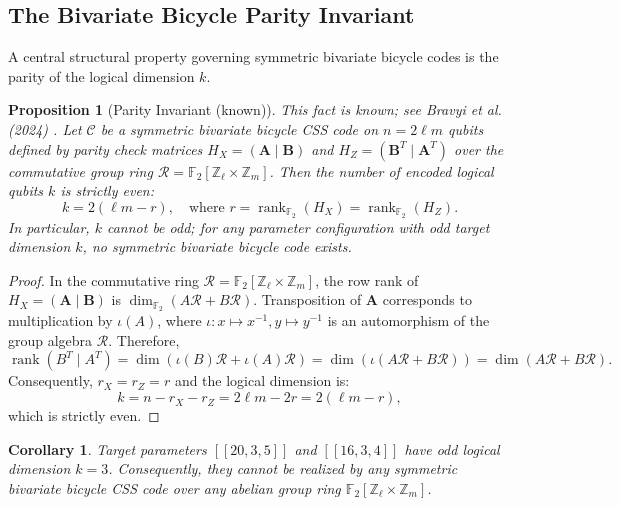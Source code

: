 \documentclass[11pt,a4paper]{article}
\newtheorem{proposition}[theorem]{Proposition}
\newtheorem{corollary}[theorem]{Corollary}
\begin{document}
\subsection{The Bivariate Bicycle Parity Invariant}
\label{sec:parity_invariant}
A central structural property governing symmetric bivariate bicycle codes is the parity of the logical dimension $k$.

\begin{proposition}[Parity Invariant (known)]
\label{prop:parity_invariant}
This fact is known; see Bravyi et al. (2024) \cite{bravyi2024bivariate}.
Let $\mathcal{C}$ be a symmetric bivariate bicycle CSS code on $n = 2\ell m$ qubits defined by parity check matrices $H_X = (\mathbf{A} \mid \mathbf{B})$ and $H_Z = (\mathbf{B}^T \mid \mathbf{A}^T)$ over the commutative group ring $\mathcal{R} = \mathbb{F}_2[\mathbb{Z}_\ell \times \mathbb{Z}_m]$. Then the number of encoded logical qubits $k$ is strictly even:
\begin{equation}
k = 2(\ell m - r), \quad \text{where } r = \operatorname{rank}_{\mathbb{F}_2}(H_X) = \operatorname{rank}_{\mathbb{F}_2}(H_Z).
\end{equation}
In particular, $k$ cannot be odd; for any parameter configuration with odd target dimension $k$, no symmetric bivariate bicycle code exists.
\end{proposition}

\begin{proof}
In the commutative ring $\mathcal{R} = \mathbb{F}_2[\mathbb{Z}_\ell \times \mathbb{Z}_m]$, the row rank of $H_X = (\mathbf{A} \mid \mathbf{B})$ is $\dim_{\mathbb{F}_2}(A \mathcal{R} + B \mathcal{R})$. Transposition of $\mathbf{A}$ corresponds to multiplication by $\iota(A)$, where $\iota \colon x \mapsto x^{-1}, y \mapsto y^{-1}$ is an automorphism of the group algebra $\mathcal{R}$. Therefore,
\begin{equation}
\operatorname{rank}(B^T \mid A^T) = \dim(\iota(B)\mathcal{R} + \iota(A)\mathcal{R}) = \dim(\iota(A\mathcal{R} + B\mathcal{R})) = \dim(A\mathcal{R} + B\mathcal{R}).
\end{equation}
Consequently, $r_X = r_Z = r$ and the logical dimension is:
\begin{equation}
k = n - r_X - r_Z = 2\ell m - 2r = 2(\ell m - r),
\end{equation}
which is strictly even.
\end{proof}

\begin{corollary}
\label{cor:k3_obstruction}
Target parameters $[[20, 3, 5]]$ and $[[16, 3, 4]]$ have odd logical dimension $k=3$. Consequently, they cannot be realized by any symmetric bivariate bicycle CSS code over any abelian group ring $\mathbb{F}_2[\mathbb{Z}_\ell \times \mathbb{Z}_m]$.
\end{corollary}
\end{document}
